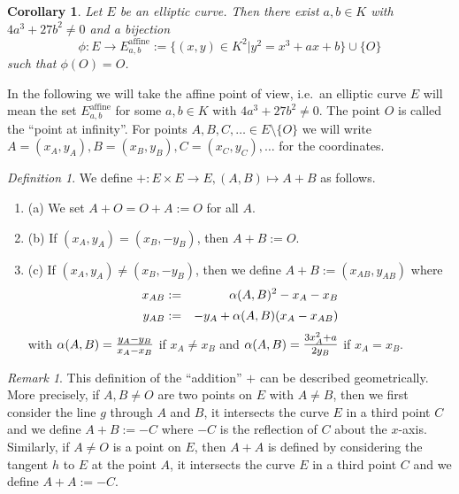 \documentclass[12pt]{amsart}
\theoremstyle{plain}
\newtheorem{corollary}[theorem]{Corollary}
\theoremstyle{remark}
\newtheorem*{remark}{Remark}
\newtheorem*{definition}{Definition}
\theoremstyle{definition}
\newcommand{\tmfrac}[2]{\mbox{\large$\frac{#1}{#2}$}}
\def\a{\alpha}
\def\sm{\setminus}
\def\bn{\begin{enumerate}}
\def\en{\end{enumerate}}
\def\a{\alpha}
\begin{document}
\begin{corollary}
Let $E$ be an elliptic curve.
Then there exist $a,b\in K$ with $4a^3+27b^2\ne 0$ and a bijection
\[ \phi\colon  E \to E_{a,b}^{\operatorname{affine}}:=\{ (x,y)\in K^2 | y^2=x^3+ax+b \} \cup \{O\} \]
such that $\phi(O)=O$.
\end{corollary}

In the following we will take the affine point of view, i.e.\ an
elliptic curve $E$ will mean the set $E_{a,b}^{\operatorname{affine}}$ for some $a,b\in K$ with $4a^3+27b^2\ne 0$.
The point $O$ is called the ``point at infinity''.
For points $A,B,C,\dots \in E\sm \{O\}$ we will write
$A=(x_A,y_A), B=(x_B,y_B), C=(x_C,y_C),\dots$ for the coordinates.

\begin{definition}
We define $+\colon E\times E\to E, (A,B)\mapsto A+B$ as follows.
\bn
\item[(a)]
We set $A+O=O+A:=O$ for all $A$.
\item[(b)]
If $(x_A,y_A)=(x_B,-y_B)$, then $A+B:=O$.
\item[(c)] If $(x_A,y_A)\ne (x_B,-y_B)$, then we define $A+B:=(x_{AB},y_{AB})$ where
\begin{eqnarray} \label{addpq}
      x_{AB} & := & \a(A,B)^2-x_A-x_B \nonumber \\[-6.5pt]
      &&\\[-6.5pt]
\vspace*{-2cm} y_{AB} & := & -y_A+\a(A,B)(x_A-x_{AB}) \nonumber
\end{eqnarray}
with $\a(A,B)=\tmfrac{y_A-y_B}{x_A-x_B}$ if $x_A\ne x_B$
and $\a(A,B)=\tmfrac{3x_A^2+a}{2 y_B}$ if $x_A=x_B$.
\en
\end{definition}

\begin{remark}
This  definition of the ``addition'' $+$ can be described geometrically. More precisely,
if $A,B \ne O$ are two points on $E$ with  $A\ne B$, then we first consider the line $g$ through $A$ and $B$, it intersects the curve $E$ in a third point $C$ and we define $A+B:=-C$ where $-C$ is the reflection of $C$ about the $x$-axis.
Similarly, if $A\ne O$ is a point on $E$, then $A+A$ is defined by considering the tangent $h$ to $E$ at the point $A$, it intersects the curve $E$ in a third point $C$ and we define $A+A:=-C$.
\begin{figure}[h]
\begin{center}

\label{fig:elliptic-curve-addition}
\end{center}
\end{figure}
\end{remark}
\end{document}
